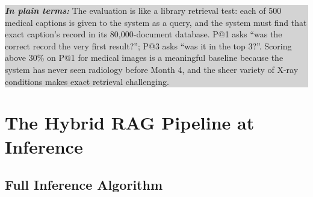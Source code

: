 \documentclass[12pt, a4paper]{article}
\theoremstyle{definition}
\theoremstyle{plain}
\theoremstyle{remark}
\newcommand{\layman}[1]{%
  \vspace{4pt}%
  \noindent\colorbox{lightgray}{\parbox{\dimexpr\linewidth-2\fboxsep}{%
    \textbf{\textit{In plain terms:}} #1}}%
  \vspace{4pt}%
}
\begin{document}
\layman{The evaluation is like a library retrieval test: each of 500 medical captions is given to the system as a query, and the system must find that exact caption's record in its 80,000-document database. P@1 asks ``was the correct record the very first result?''; P@3 asks ``was it in the top 3?''. Scoring above 30\% on P@1 for medical images is a meaningful baseline because the system has never seen radiology before Month 4, and the sheer variety of X-ray conditions makes exact retrieval challenging.}

\section{The Hybrid RAG Pipeline at Inference}
\label{sec:rag}

\subsection{Full Inference Algorithm}
\end{document}
